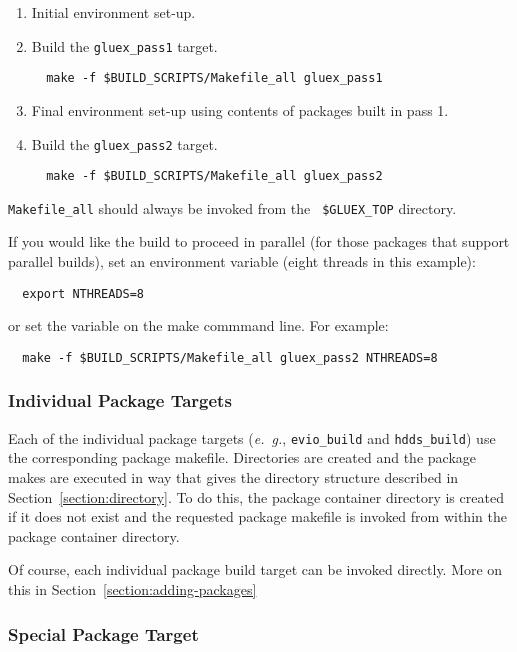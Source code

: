 \documentclass[12pt, letterpaper]{article}
\begin{document}
\begin{enumerate}
\item Initial environment set-up.
\item Build the {\tt gluex\_pass1} target.
\begin{verbatim}
  make -f $BUILD_SCRIPTS/Makefile_all gluex_pass1
\end{verbatim}
\item Final environment set-up using contents of packages built in pass 1.
\item Build the {\tt gluex\_pass2} target.
\begin{verbatim}
  make -f $BUILD_SCRIPTS/Makefile_all gluex_pass2
\end{verbatim}
\end{enumerate}

{{\tt Makefile\_all}} should always be invoked from the {\tt
  \$GLUEX\_TOP} directory.

If you would like the build to proceed in parallel (for those packages that support parallel builds), set an environment variable (eight threads in this example):
\begin{verbatim}
  export NTHREADS=8
\end{verbatim}
or set the variable on the make commmand line. For example:
\begin{verbatim}
  make -f $BUILD_SCRIPTS/Makefile_all gluex_pass2 NTHREADS=8
\end{verbatim}
\subsubsection{Individual Package Targets}

Each of the individual package targets ({\it e.~g.}, {\tt evio\_build}
and {\tt hdds\_build}) use the corresponding package
makefile. Directories are created and the package makes are executed
in way that gives the directory structure described in
Section~\ref{section:directory}. To do this, the package container
directory is created if it does not exist and the requested package
makefile is invoked from within the package container directory.

Of course, each individual package build target can be invoked
directly. More on this in Section~\ref{section:adding-packages}

\subsubsection{Special Package Target}
\end{document}
